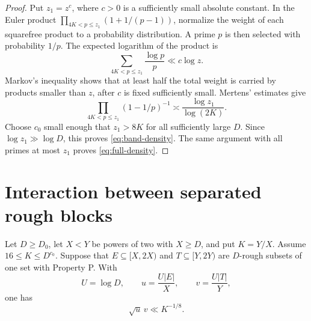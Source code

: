 \begin{proof}
Put \(z_1=z^c\), where \(c>0\) is a sufficiently small absolute
constant. In the Euler product
\(\prod_{4K<p\le z_1}(1+1/(p-1))\), normalize the weight of each
squarefree product to a probability distribution. A prime \(p\)
is then selected with probability \(1/p\). The expected logarithm
of the product is
\[
 \sum_{4K<p\le z_1}\frac{\log p}{p}\ll c\log z.
\]
Markov's inequality shows that at least half the total weight is
carried by products smaller than \(z\), after \(c\) is fixed
sufficiently small. Mertens' estimates give
\[
 \prod_{4K<p\le z_1}(1-1/p)^{-1}
       \asymp\frac{\log z_1}{\log(2K)}.
\]
Choose \(c_0\) small enough that \(z_1>8K\) for all sufficiently
large \(D\). Since \(\log z_1\gg\log D\), this proves
\eqref{eq:band-density}. The same argument with all primes at
most \(z_1\) proves \eqref{eq:full-density}.
\end{proof}

\section{Interaction between separated rough blocks}\label{sec:blocks}

\begin{lemma}\label{lem:blocks}
Let \(D\ge D_0\), let \(X<Y\) be powers of two with \(X\ge D\),
and put \(K=Y/X\). Assume \(16\le K\le D^{c_0}\).
Suppose that \(E\subseteq[X,2X)\) and \(T\subseteq[Y,2Y)\)
are \(D\)-rough subsets of one set with Property P.
With
\[
 U=\log D,\qquad u=\frac{U|E|}{X},\qquad v=\frac{U|T|}{Y},
\]
one has
\begin{equation}\label{eq:blocks}
 \sqrt u\,v\ll K^{-1/8}.
\end{equation}
\end{lemma}


